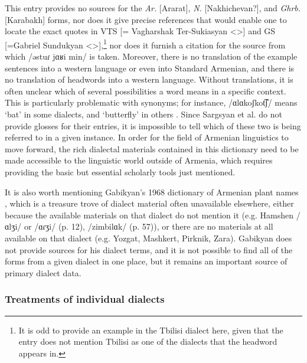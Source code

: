 \documentclass[output=paper]{langscibook}
\begin{document}
This entry provides no sources for the  \textit{Ar.} [Ararat], \textit{N.} [Nakhichevan?], and \textit{Ghrb.} [Karabakh]  forms, nor does it give precise references that would enable one to locate the exact quotes in   VTS [= Vagharshak Ter-Sukiasyan <>] and GS [=Gabriel Sundukyan <>],\footnote{It is odd to provide an example in the Tbilisi dialect here, given that the entry does not mention Tbilisi as one of the dialects that the headword appears in.} nor does it furnish a citation for the source from which /əstuɾ jɑʁi min/ is taken. Moreover, there is no translation of the example sentences into a western language or even into Standard Armenian, and there is no translation of headwords into a western language. Without translations, it is often unclear which of several possibilities a word means in a specific context. This is particularly problematic with synonyms; for instance, /ɑlɑkoʃkot͡ʃ/ means `bat' in some dialects, and `butterfly' in others \citep[cf.][17]{Sukiasyan-1965-Synonymdictionary}. Since Sargsyan et al. \citep{Sargsyan-2012-DialectalDictionary} do not provide glosses for their entries, it is impossible to tell which of these two is being referred to in a given instance. In order for the field of Armenian linguistics to move forward, the rich dialectal materials contained in this dictionary need to be made accessible to the linguistic world outside of Armenia, which requires providing the basic but essential scholarly tools just mentioned.

It is also worth mentioning   Gabikyan's 1968 dictionary of Armenian plant names \citep{Kapigyan-1968-ArmenianPlants}, which is a treasure trove of dialect material often unavailable elsewhere, either because the available materials on that dialect do not mention it  (e.g. Hamshen /ɑlʒi/ or /ɑɾʒi/ (p. 12), /zimbilɑk/ (p. 57)),  or there are no materials at all available on that dialect  (e.g. Yozgat, Mashkert, Pirknik, Zara). Gabikyan  does not provide sources for his dialect terms, and it is not possible to find all of the forms from a given dialect in one place, but it remains an important source of primary dialect data.

\subsubsection{Treatments of individual dialects}\label{sec:vaux:documentation:arm:dial}
\end{document}
